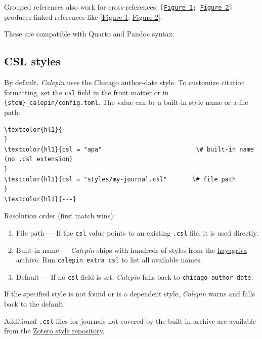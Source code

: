 Grouped references also work for cross-references: \texttt{{[}\hyperref[fig-one]{Figure 1}; \hyperref[fig-two]{Figure 2}{]}} produces linked references like {[}\hyperref[fig-one]{Figure 1}; \hyperref[fig-two]{Figure 2}{]}.

These are compatible with Quarto and Pandoc syntax.

\subsection*{CSL styles}
\label{csl-styles}

By default, \emph{Calepin} uses the Chicago author-date style. To customize citation formatting, set the \texttt{csl} field in the front matter or in \texttt{\{stem\}\_calepin/config.toml}. The value can be a built-in style name or a file path:




\begin{srccode}
\begin{Verbatim}[commandchars=\\\{\}]
\textcolor{hl1}{---
}
\textcolor{hl1}{csl = "apa"                          \# built-in name (no .csl extension)
}
\textcolor{hl1}{csl = "styles/my-journal.csl"       \# file path
}
\textcolor{hl1}{---}
\end{Verbatim}
\end{srccode}

Resolution order (first match wins):

\begin{enumerate}
\item File path --- If the \texttt{csl} value points to an existing \texttt{.csl} file, it is used directly.


\item Built-in name --- \emph{Calepin} ships with hundreds of styles from the \href{https://github.com/typst/hayagriva}{hayagriva} archive. Run \texttt{calepin extra csl} to list all available names.


\item Default --- If no \texttt{csl} field is set, \emph{Calepin} falls back to \texttt{chicago-author-date}.


\end{enumerate}

If the specified style is not found or is a dependent style, \emph{Calepin} warns and falls back to the default.

Additional \texttt{.csl} files for journals not covered by the built-in archive are available from the \href{https://www.zotero.org/styles}{Zotero style repository}.

